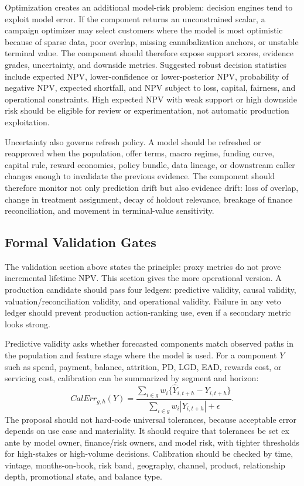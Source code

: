 \documentclass[11pt]{article}
\newcommand{\1}{\mathbf{1}}
\begin{document}
Optimization creates an additional model-risk problem: decision engines tend
to exploit model error. If the component returns an unconstrained scalar, a
campaign optimizer may select customers where the model is most optimistic
because of sparse data, poor overlap, missing cannibalization anchors, or
unstable terminal value. The component should therefore expose support scores,
evidence grades, uncertainty, and downside metrics. Suggested robust decision
statistics include expected NPV, lower-confidence or lower-posterior NPV,
probability of negative NPV, expected shortfall, and NPV subject to loss,
capital, fairness, and operational constraints. High expected NPV with weak
support or high downside risk should be eligible for review or experimentation,
not automatic production exploitation.

Uncertainty also governs refresh policy. A model should be refreshed or
reapproved when the population, offer terms, macro regime, funding curve,
capital rule, reward economics, policy bundle, data lineage, or downstream
caller changes enough to invalidate the previous evidence. The component
should therefore monitor not only prediction drift but also evidence drift:
loss of overlap, change in treatment assignment, decay of holdout relevance,
breakage of finance reconciliation, and movement in terminal-value
sensitivity.

\subsection{Formal Validation Gates}
\label{sec:validation-gates-formal}

The validation section above states the principle: proxy metrics do not prove
incremental lifetime NPV. This section gives the more operational version. A
production candidate should pass four ledgers: predictive validity, causal
validity, valuation/reconciliation validity, and operational validity. Failure
in any veto ledger should prevent production action-ranking use, even if a
secondary metric looks strong.

Predictive validity asks whether forecasted components match observed paths
in the population and feature stage where the model is used. For a component
$Y$ such as spend, payment, balance, attrition, PD, LGD, EAD, rewards cost, or
servicing cost, calibration can be summarized by segment and horizon:
\begin{equation}
  CalErr_{g,h}(Y)
  =
  \frac{
    \sum_{i\in g} w_i
    \{\widehat{Y}_{i,t+h}-Y_{i,t+h}\}
  }{
    \sum_{i\in g} w_i |Y_{i,t+h}|+\epsilon
  }.
  \label{eq:calibration-error}
\end{equation}
The proposal should not hard-code universal tolerances, because acceptable
error depends on use case and materiality. It should require that tolerances
be set ex ante by model owner, finance/risk owners, and model risk, with
tighter thresholds for high-stakes or high-volume decisions. Calibration
should be checked by time, vintage, months-on-book, risk band, geography,
channel, product, relationship depth, promotional state, and balance type.
\end{document}
